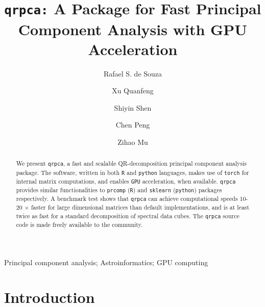 \documentclass[preprint,authoryear,11pt,5p,times]{elsarticle}
\begin{document}
\begin{frontmatter}

\title{\texttt{qrpca:} A Package for Fast Principal Component Analysis with GPU Acceleration}



\author[1]{Rafael S. de Souza}

\author[1]{Xu Quanfeng %
}%
\author[1,2]{Shiyin Shen %
}%
\author[1,3]{Chen Peng %
}%
\author[1]{Zihao Mu %
}%


\begin{abstract}
We present \texttt{qrpca}, a fast and scalable  QR-decomposition principal component analysis package.
The software, written in both \texttt{R} and \texttt{python} languages, makes use of  \texttt{torch} for internal matrix computations, and enables \texttt{GPU} acceleration, when available.  \texttt{qrpca} provides similar functionalities to \texttt{prcomp} (\texttt{R}) and \texttt{sklearn} (\texttt{python}) packages respectively. A benchmark test shows that \texttt{qrpca} can achieve computational speeds 10-20 $\times$ faster for large dimensional matrices than default implementations, and is at least twice as fast for a standard decomposition of spectral data cubes. The \texttt{qrpca} source code is made freely available to the community. 
\end{abstract}

\begin{keyword}
Principal component analysis; Astroinformatics; GPU computing    
\end{keyword}

\end{frontmatter}


\section{Introduction}
\label{sec:introduction}
\end{document}

